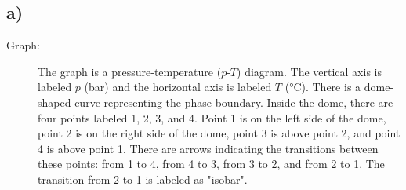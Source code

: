 

\subsection*{a)}

\begin{description}
    \item[Graph:] 
    The graph is a pressure-temperature ($p$-$T$) diagram. The vertical axis is labeled $p$ (bar) and the horizontal axis is labeled $T$ (°C). There is a dome-shaped curve representing the phase boundary. Inside the dome, there are four points labeled 1, 2, 3, and 4. Point 1 is on the left side of the dome, point 2 is on the right side of the dome, point 3 is above point 2, and point 4 is above point 1. There are arrows indicating the transitions between these points: from 1 to 4, from 4 to 3, from 3 to 2, and from 2 to 1. The transition from 2 to 1 is labeled as "isobar".
\end{description}